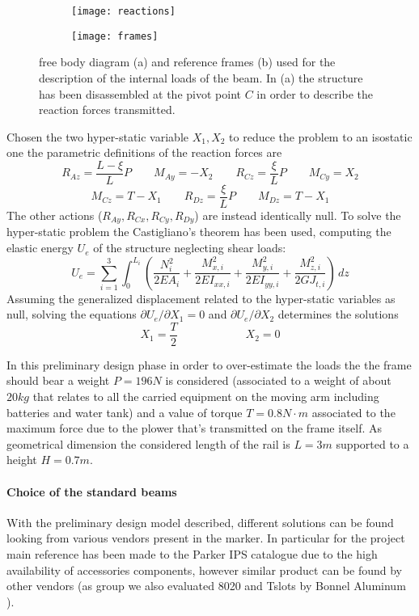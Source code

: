 	\begin{figure}[p]
		\begin{subfigure}{\linewidth}			
			\centering \texttt{[image: reactions]} \caption{}
		\end{subfigure}
		\begin{subfigure}{\linewidth}			
			\centering \texttt{[image: frames]} \caption{}
		\end{subfigure}
		\caption{free body diagram (a) and reference frames (b) used for the description of the internal loads of the beam. In (a) the structure has been disassembled at the pivot point $C$ in order to describe the reaction forces transmitted.}
		\label{fig:fbd-frames}
	\end{figure}
	
	Chosen the two hyper-static variable $X_1,X_2$ to reduce the problem to an isostatic one the parametric definitions of the reaction forces are
	\[ R_{Az} = \frac {L-\xi}L P \qquad M_{Ay} = -X_2 \qquad R_{Cz} = \frac \xi L P \qquad M_{Cy} = X_2 \] \[ M_{Cz} = T - X_1 \qquad R_{Dz} = \frac \xi L P \qquad M_{Dz} = T - X_1 \]
	The other actions ($R_{Ay},R_{Cx}, R_{Cy}, R_{Dy}$) are instead identically null. To solve the hyper-static problem the Castigliano's theorem has been used, computing the elastic energy $U_e$ of the structure neglecting shear loads:
	\[ U_e = \sum_{i=1}^3 \int_0 ^{L_i}  \left( \frac{N_i^2}{2EA_i} + \frac{M_{x,i}^2}{2 EI_{xx,i}} + \frac{M_{y,i}^2}{2 E I_{yy,i}} + \frac{M_{z,i}^2}{2G J_{t,i}}  \right)\, dz \]
	Assuming the generalized displacement related to the hyper-static variables as null, solving the equations $\partial U_e / \partial X_1 = 0$ and $\partial U_e/\partial X_2$ determines the solutions
	\[ X_1 = \frac T 2 \qquad \qquad \qquad X_2 = 0 \]
	
	
	In this preliminary design phase in order to over-estimate the loads the the frame should bear a weight $P = 196 N$ is considered (associated to a weight of about $20kg$ that relates to all the carried equipment on the moving arm including batteries and water tank) and a value of torque $T = 0.8 N\cdot m$ associated to the maximum force due to the plower that's transmitted on the frame itself. As geometrical dimension the considered length of the rail is $L=3m$ supported to a height $H = 0.7m$.
	
	\paragraph{Choice of the standard beams} With the preliminary design model described, different solutions can be found looking from various vendors present in the marker. In particular for the project main reference has been made to the Parker IPS catalogue \cite{parker-ds} due to the high availability of accessories components, however similar product can be found by other vendors (as group we also evaluated 8020 \cite{8020-ds} and Tslots by Bonnel Aluminum \cite{tslot-ds}).
	
